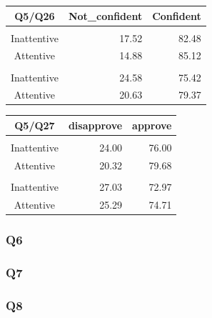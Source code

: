 \documentclass[
  11pt,
  a4paper,
]{article}
\begin{document}
\begingroup
\fontsize{12.0pt}{14.4pt}\selectfont
\begin{longtable*}{crr}
\toprule
Q5/Q26 & Not\_confident & Confident \\ 
\midrule\addlinespace[2.5pt]
 \\[2.5pt] 
\midrule\addlinespace[2.5pt]
Inattentive & 17.52 & 82.48 \\ 
Attentive & 14.88 & 85.12 \\ 
\midrule\addlinespace[2.5pt]
 \\[2.5pt] 
\midrule\addlinespace[2.5pt]
Inattentive & 24.58 & 75.42 \\ 
Attentive & 20.63 & 79.37 \\ 
\bottomrule
\end{longtable*}
\endgroup

\begingroup
\fontsize{12.0pt}{14.4pt}\selectfont
\begin{longtable*}{crr}
\toprule
Q5/Q27 & disapprove & approve \\ 
\midrule\addlinespace[2.5pt]
 \\[2.5pt] 
\midrule\addlinespace[2.5pt]
Inattentive & 24.00 & 76.00 \\ 
Attentive & 20.32 & 79.68 \\ 
\midrule\addlinespace[2.5pt]
 \\[2.5pt] 
\midrule\addlinespace[2.5pt]
Inattentive & 27.03 & 72.97 \\ 
Attentive & 25.29 & 74.71 \\ 
\bottomrule
\end{longtable*}
\endgroup

\subsubsection{Q6}\label{q6}

\subsubsection{Q7}\label{q7}

\subsubsection{Q8}\label{q8}
\end{document}
